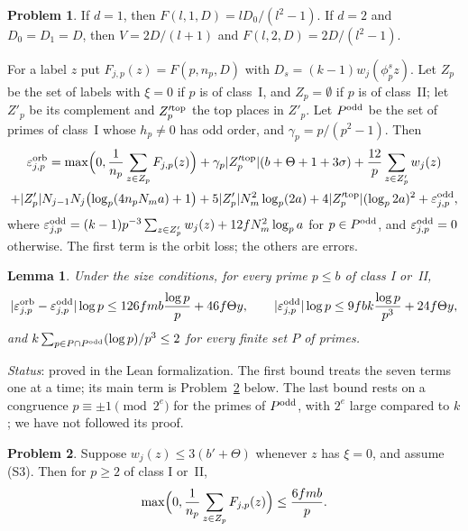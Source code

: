 \documentclass[reqno]{amsart}
\theoremstyle{definition}
\newtheorem{problem}{Problem}[section]
\theoremstyle{plain}
\newtheorem{lemma}[theorem]{Lemma}
\theoremstyle{remark}
\begin{document}
\begin{problem}\label{pr:lp-two}
If \(d=1\), then \(F(l,1,D)=lD_0/(l^2-1)\).  If \(d=2\) and \(D_0=D_1=D\), then \(V=2D/(l+1)\) and \(F(l,2,D)=2D/(l^2-1)\).
\end{problem}

For a label \(z\) put \(F_{j,p}(z)=F(p,n_p,D)\) with \(D_s=(k-1)w_j(\phi_p^sz)\).  Let \(Z_p\) be the set of labels with \(\xi=0\) if \(p\) is of class~I, and \(Z_p=\emptyset\) if \(p\) is of class~II; let \(Z'_p\) be its complement and \(Z'^{\rm top}_p\) the top places in \(Z'_p\).  Let \(P^{\rm odd}\) be the set of primes of class~I whose \(h_p\ne0\) has odd order, and \(\gamma_p=p/(p^2-1)\).  Then
\begin{multline*}
 \varepsilon^{\rm orb}_{j,p}=\max\Bigl(0,\frac1{n_p}\sum_{z\in Z_p}F_{j,p}(z)\Bigr)
 +\gamma_p\lvert Z'^{\rm top}_p\rvert(b+\Theta+1+3\sigma)+\frac{12}p\sum_{z\in Z'_p}w_j(z)\\
 +\lvert Z'_p\rvert N_{j-1}N_j\bigl(\log_p(4n_pN_ma)+1\bigr)
 +5\lvert Z'_p\rvert N_m^2\log_p(2a)+4\lvert Z'^{\rm top}_p\rvert(\log_p2a)^2+\varepsilon^{\rm odd}_{j,p},
\end{multline*}
where \(\varepsilon^{\rm odd}_{j,p}=(k-1)p^{-3}\sum_{z\in Z'_p}w_j(z)+12fN_m^2\log_pa\) for \(p\in P^{\rm odd}\), and \(\varepsilon^{\rm odd}_{j,p}=0\) otherwise.  The first term is the orbit loss; the others are errors.

\begin{lemma}\label{lem:per-prime}
Under the size conditions, for every prime \(p\le b\) of class I or~II,
\[
 \lvert\varepsilon^{\rm orb}_{j,p}-\varepsilon^{\rm odd}_{j,p}\rvert\log p\le126fmb\frac{\log p}p+46f\Theta y,\qquad
 \lvert\varepsilon^{\rm odd}_{j,p}\rvert\log p\le9fbk\frac{\log p}{p^3}+24f\Theta y,
\]
and \(k\sum_{p\in P\cap P^{\rm odd}}(\log p)/p^3\le2\) for every finite set \(P\) of primes.
\end{lemma}
\noindent\emph{Status}: proved in the Lean formalization.  The first bound treats the seven terms one at a time; its main term is Problem~\ref{pr:main-orbit} below.  The last bound rests on a congruence \(p\equiv\pm1\pmod{2^e}\) for the primes of \(P^{\rm odd}\), with \(2^e\) large compared to \(k\); we have not followed its proof.

\begin{problem}\label{pr:main-orbit}
Suppose \(w_j(z)\le3(b'+\Theta)\) whenever \(z\) has \(\xi=0\), and assume (S3).  Then for \(p\ge2\) of class I or~II,
\[
 \max\Bigl(0,\frac1{n_p}\sum_{z\in Z_p}F_{j,p}(z)\Bigr)\le\frac{6fmb}{p}.
\]
\end{problem}
\end{document}
